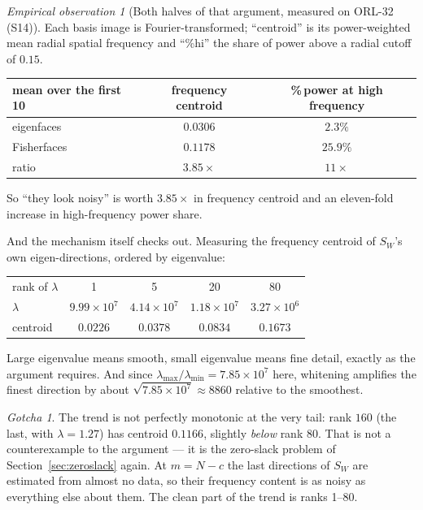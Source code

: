 \documentclass[11pt]{article}
\theoremstyle{definition}
\theoremstyle{remark}
\newtheorem*{gotcha}{Gotcha}
\newtheorem*{observation}{Empirical observation}
\newcommand{\Sw}{S_W}
\begin{document}
\begin{observation}[Both halves of that argument, measured on ORL-32 (S14)]
Each basis image is Fourier-transformed; ``centroid'' is its power-weighted mean
radial spatial frequency and ``\%hi'' the share of power above a radial cutoff of
$0.15$.
\begin{center}
\begin{tabular}{lcc}
\toprule
mean over the first 10 & frequency centroid & \%\,power at high frequency \\
\midrule
eigenfaces   & $0.0306$ & $2.3\%$ \\
Fisherfaces  & $0.1178$ & $25.9\%$ \\
\midrule
ratio        & $\mathbf{3.85\times}$ & $11\times$ \\
\bottomrule
\end{tabular}
\end{center}
So ``they look noisy'' is worth $3.85\times$ in frequency centroid and an
eleven-fold increase in high-frequency power share.

And the mechanism itself checks out. Measuring the frequency centroid of $\Sw$'s
own eigen-directions, ordered by eigenvalue:
\begin{center}
\begin{tabular}{lcccc}
\toprule
rank of $\lambda$ & 1 & 5 & 20 & 80 \\
$\lambda$         & $9.99\times10^{7}$ & $4.14\times10^{7}$ & $1.18\times10^{7}$ & $3.27\times10^{6}$ \\
centroid          & $0.0226$ & $0.0378$ & $0.0834$ & $0.1673$ \\
\bottomrule
\end{tabular}
\end{center}
Large eigenvalue means smooth, small eigenvalue means fine detail, exactly as the
argument requires. And since
$\lambda_{\max}/\lambda_{\min} = 7.85\times10^{7}$ here, whitening amplifies the
finest direction by about $\sqrt{7.85\times10^{7}} \approx 8860$ relative to the
smoothest.
\end{observation}

\begin{gotcha}
The trend is not perfectly monotonic at the very tail: rank $160$ (the last, with
$\lambda = 1.27$) has centroid $0.1166$, slightly \emph{below} rank $80$. That is
not a counterexample to the argument --- it is the zero-slack problem of
Section~\ref{sec:zeroslack} again. At $m=N-c$ the last directions of $\Sw$ are
estimated from almost no data, so their frequency content is as noisy as
everything else about them. The clean part of the trend is ranks 1--80.
\end{gotcha}
\end{document}
